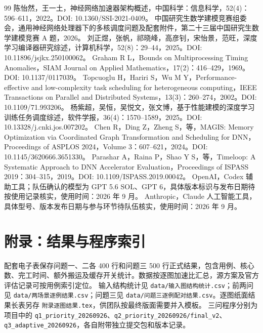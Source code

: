 \documentclass[UTF8,a4paper,zihao=-4]{ctexart}
\numberwithin{equation}{section}
\numberwithin{figure}{section}
\numberwithin{table}{section}
\begin{document}

\clearpage









\begin{thebibliography}{99}
 陈怡然，王一土，神经网络加速器架构概述，中国科学：信息科学，52(4)：596--611，2022。DOI: 10.1360/SSI-2021-0409。
 中国研究生数学建模竞赛组委会，通用神经网络处理器下的多核调度问题及配套附件，第二十三届中国研究生数学建模竞赛 A 题，2026。
 刘正煜，张帆，祁晓峰，高彦钊，宋怡景，范旺，深度学习编译器研究综述，计算机科学，52(8)：29--44，2025。DOI: 10.11896/jsjkx.250100062。
 Graham R L，Bounds on Multiprocessing Timing Anomalies，SIAM Journal on Applied Mathematics，17(2)：416--429，1969。DOI: 10.1137/0117039。
 Topcuoglu H，Hariri S，Wu M Y，Performance-effective and low-complexity task scheduling for heterogeneous computing，IEEE Transactions on Parallel and Distributed Systems，13(3)：260--274，2002。DOI: 10.1109/71.993206。
 杨紫超，吴恒，吴悦文，张文博，基于性能建模的深度学习训练任务调度综述，软件学报，36(4)：1570--1589，2025。DOI: 10.13328/j.cnki.jos.007202。
 Chen R，Ding Z，Zheng S，等，MAGIS: Memory Optimization via Coordinated Graph Transformation and Scheduling for DNN，Proceedings of ASPLOS 2024，Volume 3：607--621，2024。DOI: 10.1145/3620666.3651330。
 Parashar A，Raina P，Shao Y S，等，Timeloop: A Systematic Approach to DNN Accelerator Evaluation，Proceedings of ISPASS 2019：304--315，2019。DOI: 10.1109/ISPASS.2019.00042。
 OpenAI，Codex 辅助工具；队伍确认的模型为 GPT 5.6 SOL、GPT 6，具体版本标识与发布日期待按使用记录核实，使用时间：2026 年 9 月。
 Anthropic，Claude 人工智能工具，具体型号、版本发布日期与参与环节待队伍核实，使用时间：2026 年 9 月。
\end{thebibliography}

\clearpage
\section*{附录：结果与程序索引}
配套电子表保存问题一、二各 400 行和问题三 500 行正式结果，包含用例、核心数、完工时间、额外搬运及缓存开关统计。数据按逐图加速比汇总，源方案及官方评估记录可按用例索引定位。
输入结构统计见 \texttt{data/输入图结构统计.csv}；前两问见 \texttt{data/两场景逐例结果.csv}；问题三见 \texttt{data/问题三逐例配对结果.csv}。逐图纸面结果长表另存 \texttt{附录逐图结果.tex}，供团队按最终版面需要并入模板。
三问程序分别为项目中的 \texttt{q1\_priority\_20260926}、\texttt{q2\_priority\_20260926/final\_v2}、\texttt{q3\_adaptive\_20260926}，各自附带独立提交包和版本记录。

\end{document}
